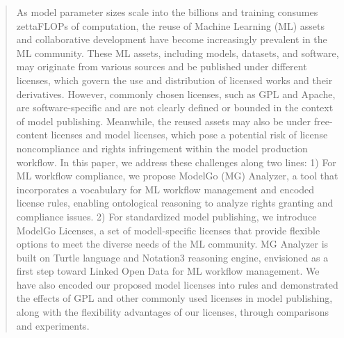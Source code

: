 \documentclass[sigconf]{acmart}
\begin{document}
\begin{abstract}
As model parameter sizes scale into the billions and training consumes zettaFLOPs of computation, the reuse of Machine Learning (ML) assets and collaborative development have become increasingly prevalent in the ML community.
These ML assets, including models, datasets, and software, may originate from various sources and be published under different licenses, which govern the use and distribution of licensed works and their derivatives.
However, commonly chosen licenses, such as GPL and Apache, are software-specific and are not clearly defined or bounded in the context of model publishing.
Meanwhile, the reused assets may also be under free-content licenses and model licenses, which pose a potential risk of license noncompliance and rights infringement within the model production workflow.
In this paper, we address these challenges along two lines:
1) For ML workflow compliance, we propose ModelGo (MG) Analyzer, a tool that incorporates a vocabulary for ML workflow management and encoded license rules, enabling ontological reasoning to analyze rights granting and compliance issues.
2) For standardized model publishing, we introduce ModelGo Licenses, a set of modell-specific licenses that provide flexible options to meet the diverse needs of the ML community.
MG Analyzer is built on Turtle language and Notation3 reasoning engine, envisioned as a first step toward Linked Open Data for ML workflow management.
We have also encoded our proposed model licenses into rules and demonstrated the effects of GPL and other commonly used licenses in model publishing, along with the flexibility advantages of our licenses, through comparisons and experiments.

\end{abstract}



\end{document}
